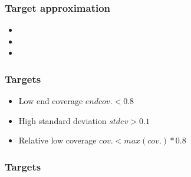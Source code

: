 \begin{frame}
	\frametitle{Target approximation}
	
	\begin{itemize}
		\item 
		\item 
		\item 
	\end{itemize}
	
\end{frame}

\begin{frame}
	\frametitle{Targets}
	
	\begin{itemize}
		\item Low end coverage $endcov. < 0.8$
		\item High standard deviation $stdev > 0.1$
		\item Relative low coverage $cov. < max(cov.) * 0.8$
	\end{itemize}
	
\end{frame}

\begin{frame}
	\frametitle{Targets}
	
	\begin{table}
		\centering
		\resizebox{\textwidth}{!}{}
	\end{table}
	
\end{frame}